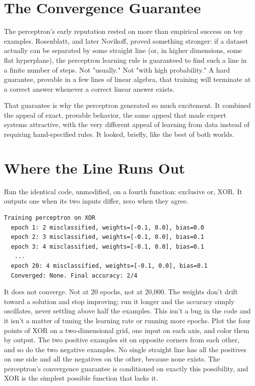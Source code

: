 \section*{The Convergence Guarantee}

The perceptron's early reputation rested on more than empirical success on toy examples. Rosenblatt, and later Novikoff, proved something stronger: if a dataset actually can be separated by some straight line (or, in higher dimensions, some flat hyperplane), the perceptron learning rule is guaranteed to find such a line in a finite number of steps. Not "usually." Not "with high probability." A hard guarantee, provable in a few lines of linear algebra, that training will terminate at a correct answer whenever a correct linear answer exists.

That guarantee is why the perceptron generated so much excitement. It combined the appeal of exact, provable behavior, the same appeal that made expert systems attractive, with the very different appeal of learning from data instead of requiring hand-specified rules. It looked, briefly, like the best of both worlds.

\section*{Where the Line Runs Out}

Run the identical code, unmodified, on a fourth function: exclusive or, XOR. It outputs one when its two inputs differ, zero when they agree.

\begin{Verbatim}[fontsize=\small, frame=single, xleftmargin=1em, xrightmargin=1em]
Training perceptron on XOR
  epoch 1: 2 misclassified, weights=[-0.1, 0.0], bias=0.0
  epoch 2: 3 misclassified, weights=[-0.1, 0.0], bias=0.1
  epoch 3: 4 misclassified, weights=[-0.1, 0.0], bias=0.1
   ...
  epoch 20: 4 misclassified, weights=[-0.1, 0.0], bias=0.1
  Converged: None. Final accuracy: 2/4
\end{Verbatim}

It does not converge. Not at 20 epochs, not at 20,000. The weights don't drift toward a solution and stop improving; run it longer and the accuracy simply oscillates, never settling above half the examples. This isn't a bug in the code and it isn't a matter of tuning the learning rate or running more epochs. Plot the four points of XOR on a two-dimensional grid, one input on each axis, and color them by output. The two positive examples sit on opposite corners from each other, and so do the two negative examples. No single straight line has all the positives on one side and all the negatives on the other, because none exists. The perceptron's convergence guarantee is conditioned on exactly this possibility, and XOR is the simplest possible function that lacks it.

